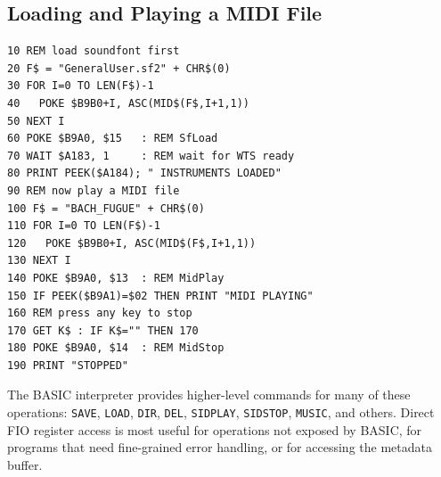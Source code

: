 \subsection{Loading and Playing a MIDI File}

\begin{lstlisting}
10 REM load soundfont first
20 F$ = "GeneralUser.sf2" + CHR$(0)
30 FOR I=0 TO LEN(F$)-1
40   POKE $B9B0+I, ASC(MID$(F$,I+1,1))
50 NEXT I
60 POKE $B9A0, $15   : REM SfLoad
70 WAIT $A183, 1     : REM wait for WTS ready
80 PRINT PEEK($A184); " INSTRUMENTS LOADED"
90 REM now play a MIDI file
100 F$ = "BACH_FUGUE" + CHR$(0)
110 FOR I=0 TO LEN(F$)-1
120   POKE $B9B0+I, ASC(MID$(F$,I+1,1))
130 NEXT I
140 POKE $B9A0, $13  : REM MidPlay
150 IF PEEK($B9A1)=$02 THEN PRINT "MIDI PLAYING"
160 REM press any key to stop
170 GET K$ : IF K$="" THEN 170
180 POKE $B9A0, $14  : REM MidStop
190 PRINT "STOPPED"
\end{lstlisting}

\begin{notebox}
The BASIC interpreter provides higher-level commands for many of these
operations: \texttt{SAVE}, \texttt{LOAD}, \texttt{DIR}, \texttt{DEL},
\texttt{SIDPLAY}, \texttt{SIDSTOP}, \texttt{MUSIC}, and others.  Direct FIO
register access is most useful for operations not exposed by BASIC, for
programs that need fine-grained error handling, or for accessing the metadata
buffer.
\end{notebox}

